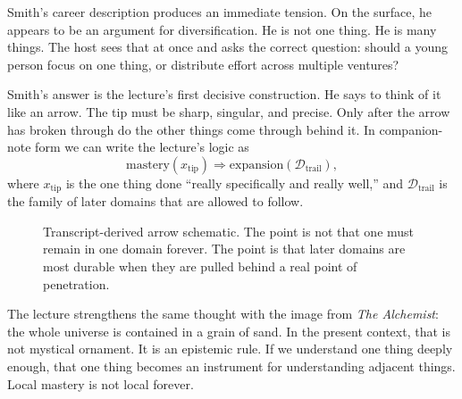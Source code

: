 Smith's career description produces an immediate tension. On the surface, he appears to be an argument for diversification. He is not one thing. He is many things. The host sees that at once and asks the correct question: should a young person focus on one thing, or distribute effort across multiple ventures?

Smith's answer is the lecture's first decisive construction. He says to think of it like an arrow. The tip must be sharp, singular, and precise. Only after the arrow has broken through do the other things come through behind it. In companion-note form we can write the lecture's logic as
\begin{equation}
\text{mastery}(x_{\mathrm{tip}})
\Longrightarrow
\text{expansion}(\mathcal D_{\mathrm{trail}}),
\end{equation}
where \(x_{\mathrm{tip}}\) is the one thing done ``really specifically and really well,'' and \(\mathcal D_{\mathrm{trail}}\) is the family of later domains that are allowed to follow.

\begin{figure}[h]
\centering
{}
\caption{Transcript-derived arrow schematic. The point is not that one must remain in one domain forever. The point is that later domains are most durable when they are pulled behind a real point of penetration.}
\end{figure}

The lecture strengthens the same thought with the image from \emph{The Alchemist}: the whole universe is contained in a grain of sand. In the present context, that is not mystical ornament. It is an epistemic rule. If we understand one thing deeply enough, that one thing becomes an instrument for understanding adjacent things. Local mastery is not local forever.

